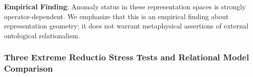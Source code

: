 \begin{table}[ht]
\centering
\small
\caption{Multi-Definition Anomaly Transfer Matrix across Six Mathematical Definitions. Values report Pearson correlation between article anomaly rankings across paradigms. Within-paradigm reliability ($r_{\text{same}}$) is evaluated via 1,000 bootstrap draws.}
\label{tab:anomaly_transfer}
\end{table}

\textbf{Empirical Finding}: Anomaly status in these representation spaces is strongly operator-dependent. We emphasize that this is an empirical finding about representation geometry; it does not warrant metaphysical assertions of external ontological relationalism.

\subsubsection{Three Extreme Reductio Stress Tests and Relational Model Comparison}


